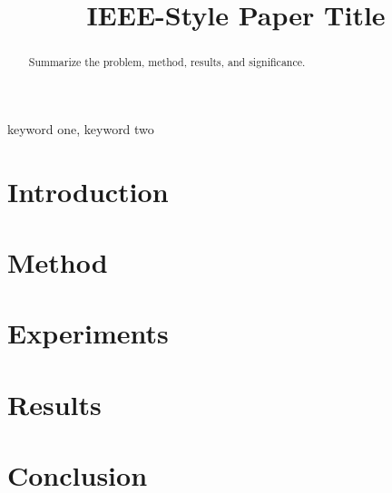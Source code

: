 \documentclass[conference]{IEEEtran}
\title{IEEE-Style Paper Title}
\author{\IEEEauthorblockN{Author Name}\IEEEauthorblockA{Affiliation\\Email}}
\begin{document}
\maketitle

\begin{abstract}
Summarize the problem, method, results, and significance.
\end{abstract}

\begin{IEEEkeywords}
keyword one, keyword two
\end{IEEEkeywords}

\section{Introduction}
\section{Method}
\section{Experiments}
\section{Results}
\section{Conclusion}

% 
% 
\end{document}
